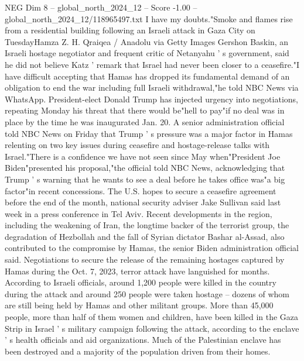 \begin{textsample}{NEG Dim 8 – global\_north\_2024\_12 – Score -1.00 – global\_north\_2024\_12/118965497.txt}
I have my doubts."Smoke and flames rise from a residential building following an Israeli attack in Gaza City on TuesdayHamza Z.
H.
Qraiqea / Anadolu via Getty Images Gershon Baskin, an Israeli hostage negotiator and frequent critic of Netanyahu ' s government, said he did not believe Katz ' remark that Israel had never been closer to a ceasefire."I have difficult accepting that Hamas has dropped its fundamental demand of an obligation to end the war including full Israeli withdrawal,"he told NBC News via WhatsApp.
President-elect Donald Trump has injected urgency into negotiations, repeating Monday his threat that there would be"hell to pay"if no deal was in place by the time he was inaugurated Jan. 20.
A senior administration official told NBC News on Friday that Trump ' s pressure was a major factor in Hamas relenting on two key issues during ceasefire and hostage-release talks with Israel."There is a confidence we have not seen since May when"President Joe Biden"presented his proposal,"the official told NBC News, acknowledging that Trump ' s warning that he wants to see a deal before he takes office was"a big factor"in recent concessions.
The U.S. hopes to secure a ceasefire agreement before the end of the month, national security adviser Jake Sullivan said last week in a press conference in Tel Aviv.
Recent developments in the region, including the weakening of Iran, the longtime backer of the terrorist group, the degradation of Hezbollah and the fall of Syrian dictator Bashar al-Assad, also contributed to the compromise by Hamas, the senior Biden administration official said.
Negotiations to secure the release of the remaining hostages captured by Hamas during the Oct. 7, 2023, terror attack have languished for months.
According to Israeli officials, around 1,200 people were killed in the country during the attack and around 250 people were taken hostage -- dozens of whom are still being held by Hamas and other militant groups.
More than 45,000 people, more than half of them women and children, have been killed in the Gaza Strip in Israel ' s military campaign following the attack, according to the enclave ' s health officials and aid organizations.
Much of the Palestinian enclave has been destroyed and a majority of the population driven from their homes.

\end{textsample}

